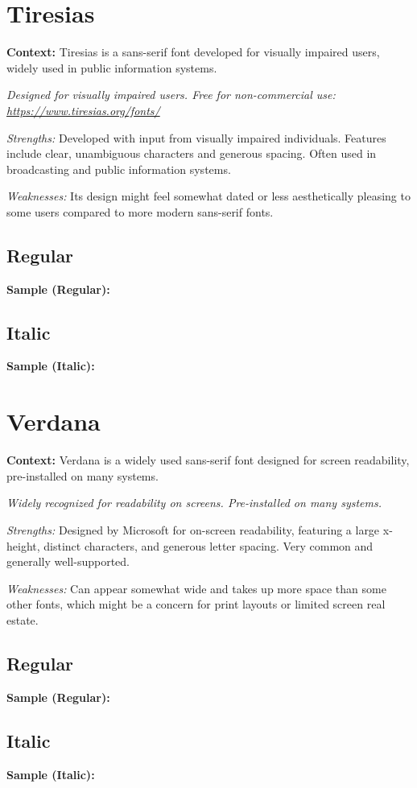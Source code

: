 \pagebreak
\section{Tiresias}\label{sec:tiresias}
\noindent
\textbf{Context:} Tiresias is a sans-serif font developed for visually impaired users, widely used in public information systems.

\emph{Designed for visually impaired users. Free for non-commercial use: \url{https://www.tiresias.org/fonts/}}
\begin{raggedright}
\emph{Strengths:} Developed with input from visually impaired individuals. Features include clear, unambiguous characters and generous spacing. Often used in broadcasting and public information systems.

\emph{Weaknesses:} Its design might feel somewhat dated or less aesthetically pleasing to some users compared to more modern sans-serif fonts.

\subsection{Regular}
\noindent\textbf{Sample (Regular):}
\FontSample{\tiresiasfont}

\subsection{Italic}
\noindent\textbf{Sample (Italic):}
\FontSample{{\tiresiasfont\itshape}}
\end{raggedright}


\pagebreak
\section{Verdana}\label{sec:verdana}
\noindent
\textbf{Context:} Verdana is a widely used sans-serif font designed for screen readability, pre-installed on many systems.

\emph{Widely recognized for readability on screens. Pre-installed on many systems.}
\begin{raggedright}
\emph{Strengths:} Designed by Microsoft for on-screen readability, featuring a large x-height, distinct characters, and generous letter spacing. Very common and generally well-supported.

\emph{Weaknesses:} Can appear somewhat wide and takes up more space than some other fonts, which might be a concern for print layouts or limited screen real estate.

\subsection{Regular}
\noindent\textbf{Sample (Regular):}
\FontSample{\verdanafont}

\subsection{Italic}
\noindent\textbf{Sample (Italic):}
\FontSample{{\verdanafont\itshape}}
\end{raggedright}




